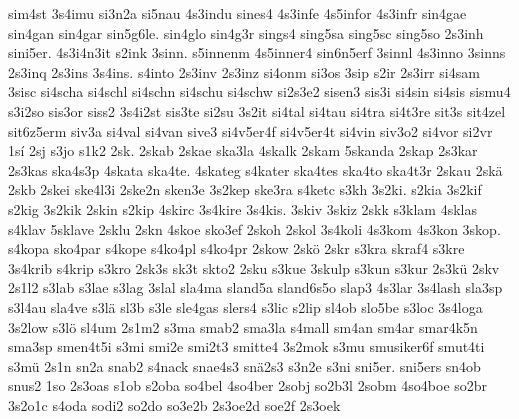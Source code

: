 {    sim4st
    3s4imu
    si3n2a
    si5nau
    4s3indu
    sines4
    4s3infe
    4s5infor
    4s3infr
    sin4gae
    sin4gan
    sin4gar
    sin5g6le.
    sin4glo
    sin4g3r
    sings4
    sing5sa
    sing5sc
    sing5so
    2s3inh
    sini5er.
    4s3i4n3it
    s2ink
    3sinn.
    s5innenm
    4s5inner4
    sin6n5erf
    3sinnl
    4s3inno
    3sinns
    2s3inq
    2s3ins
    3s4ins.
    s4into
    2s3inv
    2s3inz
    si4onm
    si3os
    3sip
    s2ir
    2s3irr
    si4sam
    3sisc
    si4scha
    si4schl
    si4schn
    si4schu
    si4schw
    si2s3e2
    sisen3
    sis3i
    si4sin
    si4sis
    sismu4
    s3i2so
    sis3or
    siss2
    3s4i2st
    sis3te
    si2su
    3s2it
    si4tal
    si4tau
    si4tra
    si4t3re
    sit3s
    sit4zel
    sit6z5erm
    siv3a
    si4val
    si4van
    sive3
    si4v5er4f
    si4v5er4t
    si4vin
    siv3o2
    si4vor
    si2vr
    1sí
    2sj
    s3jo
    s1k2
    2sk.
    2skab
    2skae
    ska3la
    4skalk
    2skam
    5skanda
    2skap
    2s3kar
    2s3kas
    ska4s3p
    4skata
    ska4te.
    4skateg
    s4kater
    ska4tes
    ska4to
    ska4t3r
    2skau
    2skä
    2skb
    2skei
    ske4l3i
    2ske2n
    sken3e
    3s2kep
    ske3ra
    s4ketc
    s3kh
    3s2ki.
    s2kia
    3s2kif
    s2kig
    3s2kik
    2skin
    s2kip
    4skirc
    3s4kire
    3s4kis.
    3skiv
    3skiz
    2skk
    s3klam
    4sklas
    s4klav
    5sklave
    2sklu
    2skn
    4skoe
    sko3ef
    2skoh
    2skol
    3s4koli
    4s3kom
    4s3kon
    3skop.
    s4kopa
    sko4par
    s4kope
    s4ko4pl
    s4ko4pr
    2skow
    2skö
    2skr
    s3kra
    skraf4
    s3kre
    3s4krib
    s4krip
    s3kro
    2sk3s
    sk3t
    skto2
    2sku
    s3kue
    3skulp
    s3kun
    s3kur
    2s3kü
    2skv
    2s1l2
    s3lab
    s3lae
    s3lag
    3slal
    sla4ma
    sland5a
    sland6s5o
    slap3
    4s3lar
    3s4lash
    sla3sp
    s3l4au
    sla4ve
    s3lä
    sl3b
    s3le
    sle4gas
    slers4
    s3lic
    s2lip
    sl4ob
    slo5be
    s3loc
    3s4loga
    3s2low
    s3lö
    sl4um
    2s1m2
    s3ma
    smab2
    sma3la
    s4mall
    sm4an
    sm4ar
    smar4k5n
    sma3sp
    smen4t5i
    s3mi
    smi2e
    smi2t3
    smitte4
    3s2mok
    s3mu
    smusiker6f
    smut4ti
    s3mü
    2s1n
    sn2a
    snab2
    s4nack
    snae4s3
    snä2s3
    s3n2e
    s3ni
    sni5er.
    sni5ers
    sn4ob
    snus2
    1so
    2s3oas
    s1ob
    s2oba
    so4bel
    4so4ber
    2sobj
    so2b3l
    2sobm
    4so4boe
    so2br
    3s2o1c
    s4oda
    sodi2
    so2do
    so3e2b
    2s3oe2d
    soe2f
    2s3oek
}
